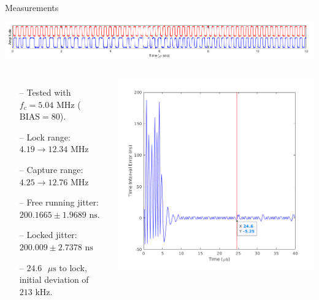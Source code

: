 \documentclass{beamer}
\begin{document}
\begin{frame}{Measurements}
	\vspace*{-5mm}
	\begin{center}
		\includegraphics[scale=0.4]{../impl_waveform}
	\end{center}
   	\begin{columns}
    	\begin{itemize}
            \item[--]
                Tested with $f_c=5.04$ MHz ($\textrm{BIAS}=80$).
    		\item[--]
	    		Lock range: $4.19\rightarrow12.34\textrm{ MHz}$ 
            \item[--]
                Capture range: $4.25\rightarrow12.76\textrm{ MHz}$
            \item[--]
                Free running jitter: $200.1665\pm1.9689\textrm{ ns}$.
            \item[--]
                Locked jitter: $200.009\pm2.7378\textrm{ ns}$
            \item[--]
                $24.6\textrm{ }\mu\textrm{s}$ to lock, initial deviation of $213\textrm{ kHz}$. 
        \end{itemize}
    	
    	\includegraphics[scale=0.2]{../TIE}
    \end{columns}
 
\end{frame}
\end{document}

